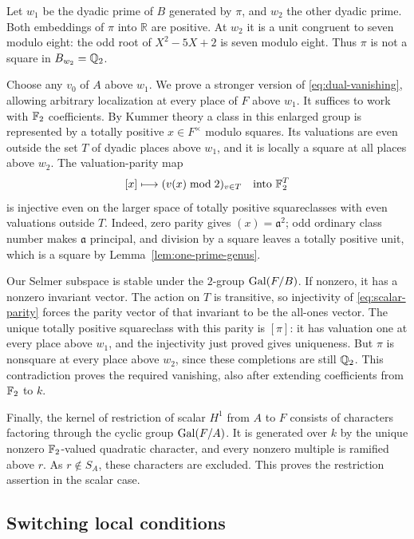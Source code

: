 Let $w_1$ be the dyadic prime of $B$ generated by $\pi$, and $w_2$
the other dyadic prime.  Both embeddings of $\pi$ into $\mathbb R$ are
positive.  At $w_2$ it is a unit congruent to seven modulo eight:
the odd root of $X^2-5X+2$ is seven modulo eight.  Thus $\pi$ is not
a square in $B_{w_2}=\mathbb Q_2$.

Choose any $v_0$ of $A$ above $w_1$.  We prove a stronger version of
\eqref{eq:dual-vanishing}, allowing arbitrary localization at every
place of $F$ above $w_1$.  It suffices to work with $\mathbb F_2$
coefficients.  By Kummer theory a class in this enlarged group is
represented by a totally positive $x\in F^\times$ modulo squares.
Its valuations are even outside the set $T$ of dyadic places above
$w_1$, and it is locally a square at all places above $w_2$.
The valuation-parity map
\begin{equation}\label{eq:scalar-parity}
             [x]\longmapsto (v(x)\bmod2)_{v\in T}
                 \quad\hbox{into }\mathbb F_2^T
\end{equation}
is injective even on the larger space of totally positive squareclasses
with even valuations outside $T$.  Indeed, zero parity gives
$(x)=\mathfrak a^2$; odd ordinary class number makes $\mathfrak a$
principal, and division by a square leaves a totally positive unit,
which is a square by Lemma~\ref{lem:one-prime-genus}.

Our Selmer subspace is stable under the $2$-group $\operatorname{Gal}(F/B)$.
If nonzero, it has a nonzero invariant vector.  The action on $T$ is
transitive, so injectivity of \eqref{eq:scalar-parity} forces the
parity vector of that invariant to be the all-ones vector.
The unique totally positive squareclass with this parity is $[\pi]$:
it has valuation one at every place above $w_1$, and the injectivity
just proved gives uniqueness.  But $\pi$ is nonsquare at every place
above $w_2$, since these completions are still $\mathbb Q_2$.
This contradiction proves the required vanishing, also after extending
coefficients from $\mathbb F_2$ to $k$.

Finally, the kernel of restriction of scalar $H^1$ from $A$ to $F$
consists of characters factoring through the cyclic group $\operatorname{Gal}(F/A)$.
It is generated over $k$ by the unique nonzero $\mathbb F_2$-valued
quadratic character, and every nonzero multiple is ramified above $r$.
As $r\notin S_A$, these characters are excluded.  This proves the
restriction assertion in the scalar case.

\subsection{Switching local conditions}

